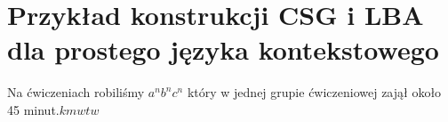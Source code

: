 \section{Przykład konstrukcji CSG i LBA dla prostego języka kontekstowego}

Na ćwiczeniach robiliśmy \( a^nb^nc^n\) który w jednej grupie ćwiczeniowej zajął około 45 minut.\( kmwtw\)
